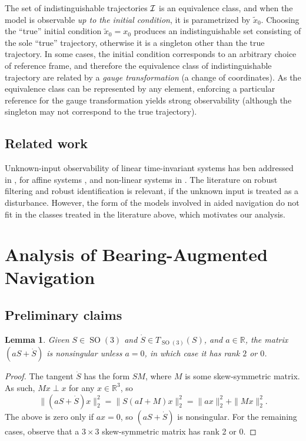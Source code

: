 \documentclass[]{article}
\newtheorem{lemma}{Lemma}
\def\RR{\mathbb{R}}
\def\SO{\operatorname{SO}}
\begin{document}
 The set of indistinguishable trajectories $\cal I$ is an equivalence class, and when the model is observable {\em up to the initial condition}, it is parametrized by $\tilde x_0$. Choosing the ``true'' initial condition $\tilde x_0 = x_0$ produces an indistinguishable set consisting of the sole ``true'' trajectory, otherwise it is a singleton other than the true trajectory. In some cases, the initial condition corresponds to an arbitrary choice of reference frame, and therefore the equivalence class of indistinguishable trajectory are related by a {\em gauge transformation} (a change of coordinates). As the equivalence class can be represented by any element, enforcing a particular reference for the gauge transformation yields strong observability (although the singleton may not correspond to the true trajectory). 


\subsection*{Related work}

Unknown-input observability of linear time-invariant systems has ben addressed in \cite{basile1969observability,hamano1983unknown}, for affine systems \cite{hammouri2010unknown}, and non-linear systems in \cite{dimassi2010robust,liberzon2012invertibility,bezzaoucha2011unknown}. The literature on robust filtering and robust identification is relevant, if the unknown input is treated as a disturbance. However, the form of the models involved in aided navigation do not fit in the classes treated in the literature above, which motivates our analysis.


\section{Analysis of Bearing-Augmented Navigation} 
\label{sect-bearing-analysis}

\subsection{Preliminary claims}

\begin{lemma}\label{lemma-one}
Given $S\in \SO(3)$ and $\dot S\in T_{\SO(3)}(S)$, 
and $a\in\RR$, the matrix $(aS + \dot S)$ is nonsingular unless $a=0$, in which case it has rank $2$ or $0$.
\end{lemma}
\begin{proof} The tangent $\dot S$ has the form $S M$, where $M$ is some skew-symmetric matrix.
As such, $Mx\perp x$ for any $x\in\RR^3$,  so
$$\|(aS+\dot S)x\|_2^2 = \|S(aI+M)x\|^2_2 = \|ax\|^2_2 +\|Mx\|^2_2.$$
The above is zero only if $ax=0$, so $(aS+\dot S)$ is nonsingular.
For the remaining cases, observe that a $3\times3$ skew-symmetric matrix has rank 2 or 0.
\end{proof}
\end{document}
